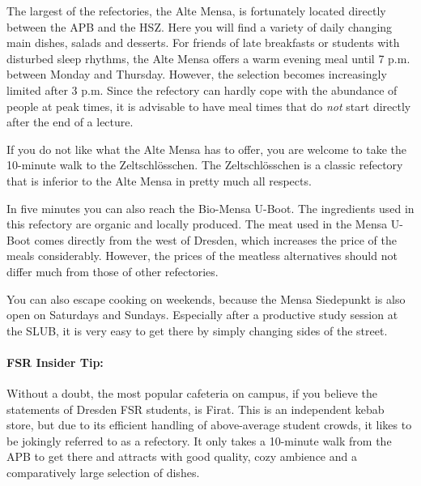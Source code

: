The largest of the refectories, the Alte Mensa, is fortunately located directly between the APB and the HSZ\@. Here you will find a variety of daily changing main dishes, salads and desserts. For friends of late breakfasts or students with disturbed sleep rhythms, the Alte Mensa offers a warm evening meal until 7 p.m. between Monday and Thursday. However, the selection becomes increasingly limited after 3 p.m. Since the refectory can hardly cope with the abundance of people at peak times, it is advisable to have meal times that do \emph{not} start directly after the end of a lecture.

If you do not like what the Alte Mensa has to offer, you are welcome to take the 10-minute walk to the Zeltschlösschen. The Zeltschlösschen is a classic refectory that is inferior to the Alte Mensa in pretty much all respects.

In five minutes you can also reach the Bio-Mensa U-Boot. The ingredients used in this refectory are organic and locally produced. The meat used in the Mensa U-Boot comes directly from the west of Dresden, which increases the price of the meals considerably. However, the prices of the meatless alternatives should not differ much from those of other refectories.

You can also escape cooking on weekends, because the Mensa Siedepunkt is also open on Saturdays and Sundays. Especially after a productive study session at the SLUB, it is very easy to get there by simply changing sides of the street.

\paragraph{FSR Insider Tip:}
Without a doubt, the most popular cafeteria on campus, if you believe the statements of Dresden FSR students, is Firat.
This is an independent kebab store, but due to its efficient handling of above-average student crowds, it likes to be jokingly referred to as a refectory.
It only takes a 10-minute walk from the APB to get there and attracts with good quality, cozy ambience and a comparatively large selection of dishes.


